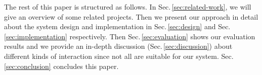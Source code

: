 The rest of this paper is structured as follows. In Sec.\,\ref{sec:related-work}, we will give an overview of some related projects. Then we present our approach in detail about the system design and implementation in Sec.\,\ref{sec:design} and Sec.\,\ref{sec:implementation} respectively. Then Sec.\,\ref{sec:evaluation} shows our evaluation results and we provide an in-depth discussion (Sec.\,\ref{sec:discussion}) about different kinds of interaction since not all are suitable for our system. Sec.\,\ref{sec:conclusion} concludes this paper.


